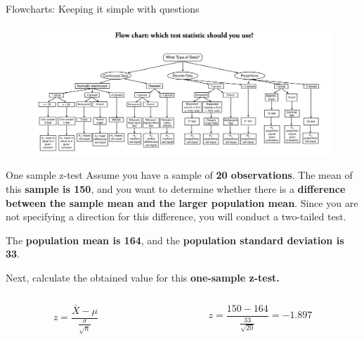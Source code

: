 \documentclass[
  ignorenonframetext,
]{beamer}
\begin{document}
\begin{frame}{Flowcharts: Keeping it simple with questions}
\label{flowcharts-keeping-it-simple-with-questions-1}
\begin{figure}

{\centering \includegraphics[width=1\linewidth]{fig/which_test_flowchart} 

}

\end{figure}
\end{frame}

\begin{frame}{One sample z-test}
\label{one-sample-z-test}
Assume you have a sample of \textbf{20 observations}. The mean of this
\textbf{sample is 150}, and you want to determine whether there is a
\textbf{difference between the sample mean and the larger population
mean}. Since you are not specifying a direction for this difference, you
will conduct a two-tailed test.

The \textbf{population mean is 164}, and the \textbf{population standard
deviation is 33}.

Next, calculate the obtained value for this \textbf{one-sample z-test.}

\begin{columns}[T]
\begin{column}{0.5\textwidth}
\vspace{1cm}

\[
z = \frac{\bar{X} - \mu}{\frac{\sigma}{\sqrt{n}}}
\]
\end{column}

\begin{column}{0.5\textwidth}
\vspace{1cm}

\[
z = \frac{150 - 164}{\frac{33}{\sqrt{20}}} = -1.897
\]
\end{column}
\end{columns}
\end{frame}
\end{document}
